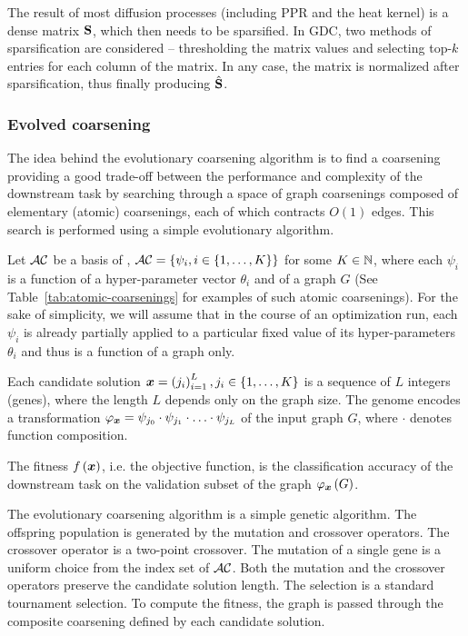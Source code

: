 The result of most diffusion processes (including PPR and the heat kernel) is a dense matrix \( \mathbf{S} \), which then needs to be sparsified. In GDC, two methods of sparsification are considered -- thresholding the matrix values and selecting top-\( k \) entries for each column of the matrix. In any case, the matrix is normalized after sparsification, thus finally producing \( \hat{\mathbf{S}} \).

\subsubsection{Evolved coarsening}

The idea behind the evolutionary coarsening algorithm is to find a coarsening providing a good trade-off between the performance and complexity of the downstream task by searching through a space of graph coarsenings composed of elementary (atomic) coarsenings, each of which contracts \( O(1) \) edges. This search is performed using a simple evolutionary algorithm.

Let \( \mathcal{AC} \) be a basis of , \( \mathcal{AC} = \left\{\psi_i, i \in \left\{1, \dots, K \right\} \right\} \) for some \( K \in \mathbb{N} \), where each \( \psi_i \) is a function of a hyper-parameter vector \( \theta_i \) and of a graph \( G \) (See Table~\ref{tab:atomic-coarsenings} for examples of such atomic coarsenings). For the sake of simplicity, we will assume that in the course of an optimization run, each \( \psi_i \) is already partially applied to a particular fixed value of its hyper-parameters \( \theta_i \) and thus is a function of a graph only.

Each candidate solution \( \bm{x} = \left( j_i \right)_{i = 1}^L, j_i \in \left\{1, \dots, K \right\} \) is a sequence of \( L \) integers (genes), where the length \( L \) depends only on the graph size. The genome encodes a transformation \( \varphi_{\bm{x}} = \psi_{j_0} \cdot \psi_{j_1} \cdot \ldots \cdot \psi_{j_L} \) of the input graph \( G \), where \( \cdot \) denotes function composition.

The fitness \( f \left( \bm{x} \right) \), i.e. the objective function, is the classification accuracy of the downstream task on the validation subset of the graph \( \varphi_{\bm{x}} \left( G \right) \).

The evolutionary coarsening algorithm is a simple genetic algorithm. The offspring population is generated by the mutation and crossover operators. The crossover operator is a two-point crossover. The mutation of a single gene is a uniform choice from the index set of \( \mathcal{AC} \). Both the mutation and the crossover operators preserve the candidate solution length. The selection is a standard tournament selection. To compute the fitness, the graph is passed through the composite coarsening defined by each candidate solution.
